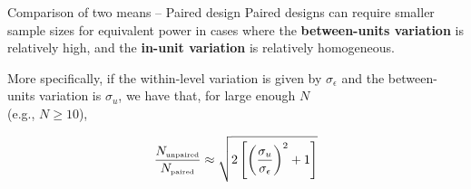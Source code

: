 %
%
%
%

\begin{frame}{Comparison of two means -- Paired design}
Paired designs can require smaller sample sizes for equivalent power in cases where the {\bf between-units variation} is relatively high, and the {\bf in-unit variation} is relatively homogeneous.\bigskip

More specifically, if the within-level variation is given by $\sigma_\epsilon$ and the between-units variation is $\sigma_u$, we have that, for large enough $N$\\(e.g., $N\geq 10$),

\begin{equation*}
\frac{N_{\mbox{\tiny unpaired}}}{N_{\mbox{\tiny paired}}}\approx\sqrt{2\left[\left(\frac{\sigma_u}{\sigma_\epsilon}\right)^2+1\right]}
\end{equation*}
\end{frame}


%
%
%
%
%

